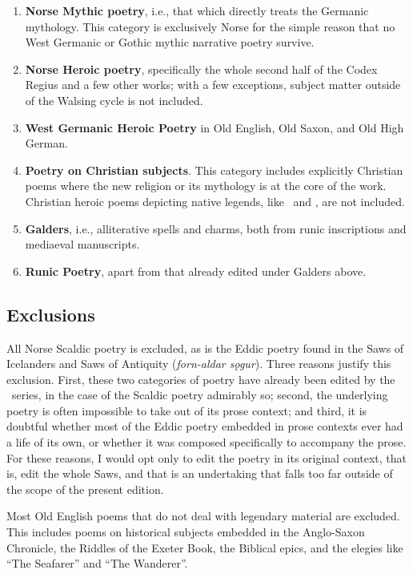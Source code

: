   \begin{enumerate}
    \item \textbf{Norse Mythic poetry}, i.e., that which directly treats the Germanic mythology.  This category is exclusively Norse for the simple reason that no West Germanic or Gothic mythic narrative poetry survive.
    \item \textbf{Norse Heroic poetry}, specifically the whole second half of the Codex Regius and a few other works; with a few exceptions, subject matter outside of the Walsing cycle is not included.
    \item \textbf{West Germanic Heroic Poetry} in Old English, Old Saxon, and Old High German.
    \item \textbf{Poetry on Christian subjects}.  This category includes explicitly Christian poems where the new religion or its mythology is at the core of the work.  Christian heroic poems depicting native legends, like \Beowulf\ and , are not included.
    \item \textbf{Galders}, i.e., alliterative spells and charms, both from runic inscriptions and mediaeval manuscripts.
    \item \textbf{Runic Poetry}, apart from that already edited under Galders above.
  \end{enumerate}

  \subsection{Exclusions}
    All Norse Scaldic poetry is excluded, as is the Eddic poetry found in the Saws of Icelanders and Saws of Antiquity (\emph{forn-aldar sǫgur}).  Three reasons justify this exclusion.  First, these two categories of poetry have already been edited by the \Skp\ series, in the case of the Scaldic poetry admirably so; second, the underlying poetry is often impossible to take out of its prose context; and third, it is doubtful whether most of the Eddic poetry embedded in prose contexts ever had a life of its own, or whether it was composed specifically to accompany the prose.  For these reasons, I would opt only to edit the poetry in its original context, that is, edit the whole Saws, and that is an undertaking that falls too far outside of the scope of the present edition.

    Most Old English poems that do not deal with legendary material are excluded.  This includes poems on historical subjects embedded in the Anglo-Saxon Chronicle, the Riddles of the Exeter Book, the Biblical epics, and the elegies like “The Seafarer” and “The Wanderer”.

